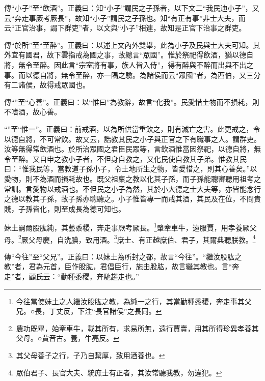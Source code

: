 {\noindent\zhuan{}\fzbyks 傳“小子”至“飲酒”。正義曰：知“小子”謂民之子孫者，以下文二“我民迪小子”，又云“奔走事厥考厥長”，故知“小子”謂民之子孫也。知“有正有事”非士大夫，而云“正官治事，謂下群吏”者，以文與“小子”相連，故知是正官下治事之群吏。 \par}

{\noindent\zhuan{}\fzbyks 傳“於所”至“至醉”。正義曰：以述上文內外雙舉，此為小子及民與士大夫可知。其外宜有國君，故下雲指戒為國之事，故總言“眾國”。惟於祭祀得飲酒，猶以德自將，無令至醉。因此言“宗室將有事，族人皆入侍”，得有醉與不醉而出與不出之事。而以德自將，無令至醉，亦一隅之驗。為諸侯而云“眾國”者，為西伯，又三分有二諸侯，故得戒眾國也。 \par}

{\noindent\zhuan{}\fzbyks 傳“”至“心善”。正義曰：以“惟曰”為教辭，故言“化我”。民愛惜土物而不損耗，則不嗜酒，故心善。 \par}

{\noindent\shu{}\fzkt “”至“惟一”。正義曰：前戒酒，以為所供當重飲之，則有滅亡之害。此更戒之，令以德自將，不可常飲。故又云，誥教其民之小子與正官之下有職事之人。謂群吏。汝等無得常飲酒也。於所治眾國之君臣民眾等，言飲酒惟當因祭祀，以德自將，無令至醉。又自申之教小子者，不但身自教之，又化民使自教其子弟。惟教其民曰：“惟我民等，當教道子孫小子，令土地所生之物，皆愛惜之，則其心善矣。”以愛物，則不為酒而損耗故也。既父祖稟之教以化其子孫，而子孫能聰審聽用祖考之常訓。言愛物以戒酒也。不但民之小子為然，其於小大德之士大夫等，亦皆能念行之德以教其子孫，故子孫亦聰聽之。小子惟皆專一而戒其酒，其民及在位，不問貴賤，子孫皆化，則至成長為德可知也。 \par}

妹土嗣爾股肱純，其藝黍稷，奔走事厥考厥長。\footnote{今往當使妹土之人繼汝股肱之教，為純一之行，其當勤種黍稷，奔走事其父兄。○長，丁丈反，下注“長官諸侯”之長同。}肇牽車牛，遠服賈，用孝養厥父母。\footnote{農功既畢，始牽車牛，載其所有，求易所無，遠行賈賣，用其所得珍異孝養其父母。○賈音古。養，牛亮反。}厥父母慶，自洗腆，致用酒。\footnote{其父母善子之行，子乃自絜厚，致用酒養也。}庶士、有正越庶伯、君子，其爾典聽朕教。\footnote{眾伯君子、長官大夫、統庶士有正者，其汝常聽我教，勿違犯。}


{\noindent\zhuan{}\fzbyks 傳“今往”至“父兄”。正義曰：以妹土為所封之都，故言“今往”。“繼汝股肱之教”者，君為元首，臣作股肱，君倡臣行，施由股肱，故言繼其教也。言“奔走”者，顧氏云：“勤種黍稷，奔馳趨走也。” \par}

